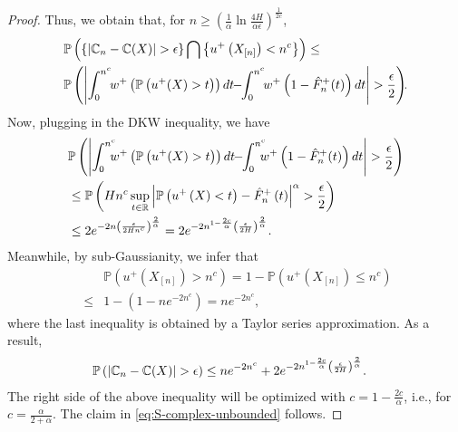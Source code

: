 \begin{proof}
Thus, we obtain that, for $n \geq \left(\frac{1}{\alpha} \ln\frac{4H}{\alpha \epsilon} \right)^{\frac{1}{2c}}$, 
\begin{align*}
&\mathbb{P}\left(\{\left|\C_n -\C(X) \right| > \epsilon\} \bigcap \left\{u^+\left(X_{[n]}\right) < n^c\right\}\right)\leq \\ 
&\mathbb{P}\left(\left|\int_0^{n^c}\!\! w^+ \left(\Prob{u^+(X)>t}\right)dt \!\!-\!\! 
\int_0^{n^c}\!\!w^+\left(1- {\hat F^+_n}(t)\right) dt\right| > \frac{\epsilon}{2}\right)\!\!.
\end{align*}
Now, plugging in the DKW inequality, we have
\begin{align}
&\mathbb{P}\left(\left|\int_0^{n^c}\!\!\!\! w^+\left(\Prob{u^+(X)>t}\right) dt \!\!-\!\! \int_0^{n^c}\!\!\!\! w^+\left(1- {\hat F^+_n}(t)\right) dt\right|>\frac{\epsilon}{2}\right)
\nonumber\\
& \leq \mathbb{P}\left(Hn^c\sup_{t\in \mathbb{R}} \left|\Prob{u^+\left(X\right)<t}-{\hat F^+_n}\left(t\right)\right|^\alpha > \frac{\epsilon}{2}\right)
\nonumber\\
&
\leq  2 e^{-2n \left(\frac{\epsilon}{2Hn^c} \right)^\frac{2}{\alpha}} = 
2 e^{-2n^{1-\frac{2c}{\alpha}}\left(\frac{\epsilon}{2H}\right)^{\frac{2}{\alpha}}} .\label{eq:dkw3}
\end{align}
Meanwhile, by sub-Gaussianity, we infer that
\begin{align*}
\,\,&\mathbb{P}\left(u^+ \left(X_{[n]}\right) >  n^c \right) = 1- \mathbb{P}\left(u^+ \left(X_{[n]} \right) \leq n^c \right)\\
\,\,\leq &1- \left(1- ne^{-2n^c} \right) = ne^{-2n^c},
\end{align*}
where the last inequality is obtained by a Taylor series approximation.
As a result, 
\begin{align*}
& \mathbb{P}\left(\left|\mathbb{C}_n -\mathbb{C}(X) \right| > \epsilon \right) 
\leq n e ^{-2n^c} + 2 e^{-2n^{1-\frac{2c}{\alpha}}\left(\frac{\epsilon}{2H}\right)^{\frac{2}{\alpha}}}.
\end{align*}
The right side of the above inequality will be optimized with $c = 1 - \frac{2c}{\alpha}$, i.e., for $c = \frac{\alpha}{2+\alpha}$. The claim in \eqref{eq:S-complex-unbounded} follows.


\end{proof}
